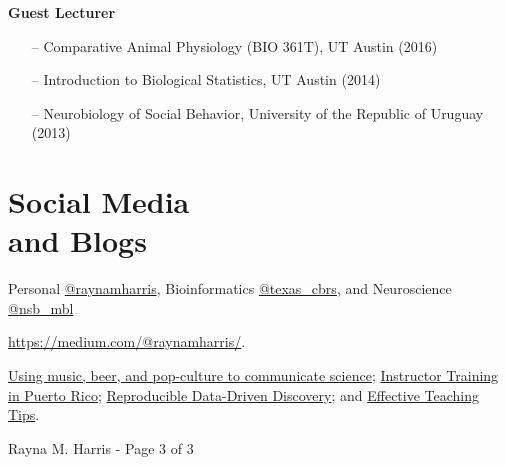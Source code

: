 \documentclass[margin,line]{CV}
\begin{document}
\begin{resume}
{\bf Guest Lecturer}
\begin{itemize}
\item[--] Comparative Animal Physiology (BIO 361T), UT Austin (2016)
\item[--] Introduction to Biological Statistics, UT Austin (2014)
\item[--] Neurobiology of Social Behavior, University of the Republic of Uruguay (2013)
\end{itemize}



\section{\mysidestyle Social Media\\and Blogs}

\begin{description}{}{
\setlength{\leftmargin}{1cm}%
\setlength{\itemindent}{-1cm}
}
\setlength{\itemsep}{1pt}
\item[Twitter:] Personal \href{http://twitter.com/raynamharris}{@raynamharris}, Bioinformatics \href{http://twitter.com/texas\_cbrs}{@texas\_cbrs}, and Neuroscience \href{http://twitter.com/nsb\_mbl}{@nsb\_mbl} 
\item[Professional/personal blog:] \url{https://medium.com/@raynamharris/}. \item[Selected blog posts:] 
\href{https://medium.com/@raynamharris/zombie-brains-microbial-mind-control-8f3c507255dc}{Using music, beer, and pop-culture to communicate science};
\href{https://medium.com/@raynamharris/instructor-training-in-puerto-rico-7c1ebc02e398}{Instructor Training in Puerto Rico};
\href{https://medium.com/@raynamharris/reproducible-data-driven-discovery-decbf1de2f46#.c63q0cget}{Reproducible Data-Driven Discovery}; and
\href{http://blogs.plos.org/neuro/2015/02/12/effective-teaching-tips-from-a-train-the-trainers-workshop/}{Effective Teaching Tips}.

\end{description}



\vspace{0.5 cm}
{\centerline {Rayna M. Harris - Page 3 of 3}}

\end{resume}
\end{document}
